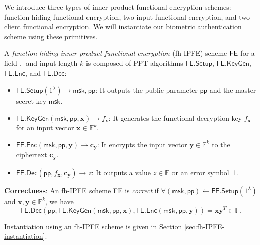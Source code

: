 We introduce three types of inner product functional encryption schemes: function hiding functional encryption, two-input functional encryption, and two-client functional encryption. We will instantiate our biometric authentication scheme using these primitives.

\begin{definition}
\label{def:fh-IPFE}
	A \emph{function hiding inner product functional encryption} (fh-IPFE) scheme $\sf FE$ for a field $\mathbb{F}$ and input length $k$ is composed of PPT algorithms $\textsf{FE.Setup}$, $\textsf{FE.KeyGen}$, $\textsf{FE.Enc}$, and $\textsf{FE.Dec}$:

	\begin{itemize}
	
		\item $\textsf{FE.Setup}(1^\lambda) \to \textsf{msk}, \textsf{pp}$: It outputs the public parameter $\textsf{pp}$ and the master secret key $\textsf{msk}$.
	
		\item $\textsf{FE.KeyGen}(\textsf{msk}, \textsf{pp}, \mathbf{x}) \to f_\mathbf{x}$: It generates the functional decryption key $f_\mathbf{x}$ for an input vector $\mathbf{x} \in \mathbb{F}^k$. 
	
		\item $\textsf{FE.Enc}(\textsf{msk}, \textsf{pp}, \mathbf{y}) \to \mathbf{c_y}$: It encrypts the input vector $\mathbf{y} \in \mathbb{F}^k$ to the ciphertext $\mathbf{c_y}$. 
	
		\item $\textsf{FE.Dec}(\textsf{pp}, f_\mathbf{x}, \mathbf{c_y}) \to z$: It outputs a value $z \in \mathbb{F}$ or an error symbol $\bot$.
	
	\end{itemize}
	
	\noindent \textbf{Correctness}: An fh-IPFE scheme \textsf{FE} is \emph{correct} if $\forall (\textsf{msk}, \textsf{pp}) \gets \textsf{FE.Setup}(1^\lambda)$ and $ \mathbf{x}, \mathbf{y} \in \mathbb{F}^k$, we have
	\[
		\textsf{FE.Dec}( \textsf{pp}, \textsf{FE.KeyGen}(\textsf{msk}, \textsf{pp}, \mathbf{x}), \textsf{FE.Enc}(\textsf{msk}, \textsf{pp}, \mathbf{y}) ) = \mathbf{x} \mathbf{y}^T \in \mathbb{F}.
	\]

\end{definition}

Instantiation using an fh-IPFE scheme is given in Section \ref{sec:fh-IPFE-instantiation}.

